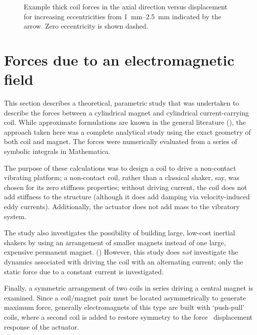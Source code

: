 \begin{figure}
\centering
{}
\caption{Example thick coil forces in the axial direction versus displacement for increasing eccentricities from \SIrange{1}{2.5}{mm} indicated by the arrow. Zero eccentricity is shown dashed.}
\end{figure}










\section{Forces due to an electromagnetic field}

This section describes a theoretical, parametric study that was undertaken to
describe the forces between a cylindrical magnet and cylindrical
current-carrying coil. While approximate formulations are known in the general
literature (), the approach taken here was a complete
analytical study using the exact geometry of both coil and magnet. The
forces were numerically evaluated from a series of symbolic integrals in
Mathematica.

The purpose of these calculations was to design a coil to drive a non-contact
vibrating platform; a non-contact coil, rather than a classical shaker, say,
was chosen for its zero stiffness properties; without driving current, the
coil does not add stiffness to the structure (although it does add damping via
velocity-induced eddy currents). Additionally, the actuator does not add mass
to the vibratory system. 

The study also investigates the possibility of building large, low-cost
inertial shakers by using an arrangement of smaller magnets instead of one
large, expensive permanent magnet. () However, this study does \emph{not} investigate the dynamics
associated with driving the coil with an alternating current; only the static
force due to a constant current is investigated.


Finally, a symmetric arrangement of two coils in series driving a central
magnet is examined. Since a coil/magnet pair must be located asymmetrically to
generate maximum force, generally electromagnets of this type are built with
`push-pull' coils, where a second coil is added to restore symmetry to the
force \vs\  displacement response of the actuator.

